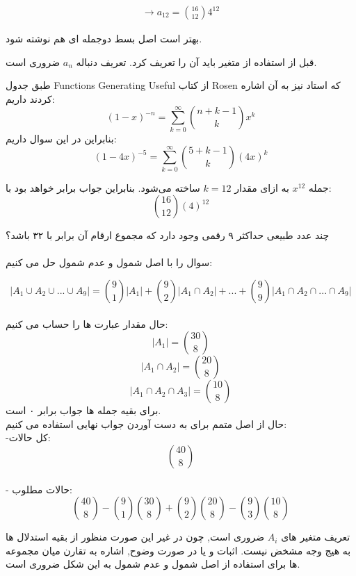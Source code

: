 \documentclass[11pt,largemargins]{h2wp}
\begin{document}
\begin{align*}
  \longrightarrow a_{12} = \binom{16}{12} 4 ^ {12}
\end{align*}



\notes

بهتر است اصل بسط دوجمله ای هم نوشته شود.

قبل از استفاده از متغیر باید آن را تعریف کرد. تعریف دنباله $a_n$ ضروری است. 


طبق جدول
  Functions Generating Useful
از کتاب Rosen
که استاد نیز به آن اشاره کردند داریم:\\
$$(1 - x) ^ {-n} = \sum_{k = 0}^{\infty} \binom{n + k - 1}{k} x^{k} $$
  بنابراین در این سوال داریم:
$$(1 - 4x) ^ {-5} =
\sum_{k = 0}^{\infty} \binom{5 + k - 1}{k} (4x)^k $$

جمله $x^{12}$ به ازای مقدار $k = 12$ ساخته می‌شود. بنابراین جواب برابر خواهد بود با: 
$$\binom{16}{12} (4)^{12}$$


\question
چند عدد طبیعی حداکثر ۹ رقمی وجود دارد که مجموع ارقام آن برابر با ۳۲ باشد؟\\ \\
\solution
  سوال را با اصل شمول و عدم شمول حل می کنیم: 
   
    \[|A_1\cup A_2\cup... \cup A_9|=\binom{9}{1}|A_1|+\binom{9}{2}|A_1\cap A_2|+...+\binom{9}{9}|A_1\cap A_2\cap...\cap A_9|\]\\
    حال مقدار عبارت ها را حساب می کنیم:\\
    \[|A_1|=\binom{30}{8}\]
    \[|A_1\cap A_2|=\binom{20}{8}\]
    \[|A_1\cap A_2\cap A_3|=\binom{10}{8}\]
    برای بقیه جمله ها جواب برابر ۰ است.\\
    حال از اصل متمم برای به دست آوردن جواب نهایی استفاده می کنیم:\\
        -کل حالات:
     \[\binom{40}{8}\]\\
     - حالات مطلوب:
     \[\binom{40}{8}- \binom{9}{1}\binom{30}{8}+\binom{9}{2}\binom{20}{8}-\binom{9}{3}\binom{10}{8}\]
     
\notes
{}
تعریف متغیر های $A_i$ ضروری است, چون در غیر این صورت منظور از بقیه استدلال ها به هیج وجه مشخض نیست.
اثبات و یا در صورت وضوح, اشاره به تقارن میان مجموعه ها برای استفاده از اصل شمول و عدم شمول به این شکل ضروری است.
\end{document}
